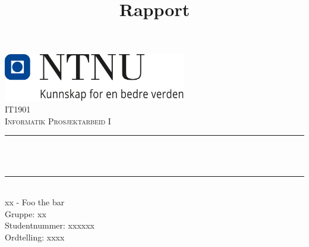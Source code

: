 \documentclass[12pt,a4paper]{article}
\title{Rapport}
\def \fagkode{IT1901}
\def \fagtittel{Informatik Prosjektarbeid I}
\def \studentnummer{xxxxxx}
\def \gruppenummer{xx}
\def \ordtelling{xxxx}
\def \tema{xx - Foo the bar}
\begin{document}
\makeatletter
\begin{titlepage}
    \begin{center}
    \includegraphics[width=0.60\textwidth]{NTNU_logo.png}\\[1cm]
    \textsc{\Large \fagkode}\\[0.5cm]
    \textsc{\large \fagtittel}\\[0.5cm]

    \rule{\linewidth}{0.5mm} \\[0.4cm]
    { \huge \bfseries \@title \\[0.4cm] }
    \rule{\linewidth}{0.5mm} \\[1.5cm]

    \LARGE
    \tema\\[1cm]

    \large
    Gruppe: \gruppenummer\\[0.25cm]

    \large
    Studentnummer: \studentnummer\\[0.25cm]

    \large
    Ordtelling: \ordtelling

    \vfill

    \large
    \@date
    \end{center}
\end{titlepage}
\makeatother
\end{document}
